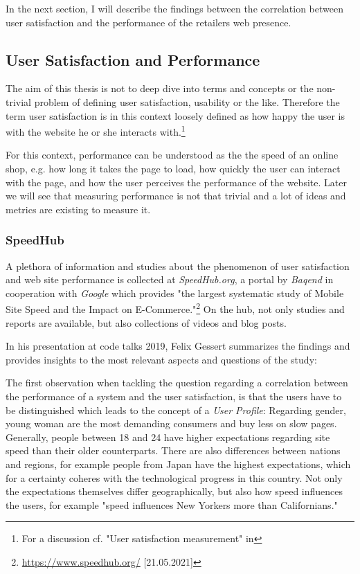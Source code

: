 In the next section, I will describe the findings between the correlation between user satisfaction and the performance of the retailers web presence.





\subsection{User Satisfaction and Performance}

The aim of this thesis is not to deep dive into terms and concepts or the non-trivial problem of defining user satisfaction, usability or the like.
Therefore the term user satisfaction is in this context loosely defined as how happy the user is with the website he or she interacts with.\footnote{For a discussion cf. "User satisfaction measurement" in } %

For this context, performance can be understood as the the speed of an online shop, e.g. how long it takes the page to load, how quickly the user can interact with the page, and how the user perceives the performance of the website.
Later we will see that measuring performance is not that trivial and a lot of ideas and metrics are existing to measure it.

\subsubsection{SpeedHub}
A plethora of information and studies about the phenomenon of user satisfaction and web site performance is collected at \textit{SpeedHub.org}, a portal by \textit{Baqend} in cooperation with \textit{Google} which provides "the largest systematic study of Mobile Site Speed and the Impact on E-Commerce."\footnote{\url{https://www.speedhub.org/} [21.05.2021]}
On the hub, not only studies and reports are available, but also collections of videos and blog posts.

In his presentation at code talks 2019, Felix Gessert summarizes the findings and provides insights to the most relevant aspects and questions of the study: %

The first observation when tackling the question regarding a correlation between the performance of a system and the user satisfaction, is that the users have to be distinguished which leads to the concept of a \textit{User Profile}: Regarding gender, young woman are the most demanding consumers and buy less on slow pages.
Generally, people between 18 and 24 have higher expectations regarding site speed than their older counterparts.
There are also differences between nations and regions, for example people from Japan have the highest expectations, which for a certainty coheres with the technological progress in this country.
Not only the expectations themselves differ geographically, but also how speed influences the users, for example "speed influences New Yorkers more than Californians."

